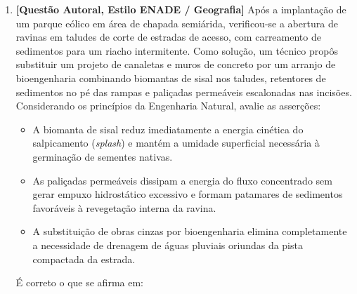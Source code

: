 \begin{enumerate}[leftmargin=1.8em, itemsep=7pt]
  \item \textbf{[Questão Autoral, Estilo ENADE / Geografia]} Após a implantação de um parque eólico em área de chapada semiárida, verificou-se a abertura de ravinas em taludes de corte de estradas de acesso, com carreamento de sedimentos para um riacho intermitente. Como solução, um técnico propôs substituir um projeto de canaletas e muros de concreto por um arranjo de bioengenharia combinando biomantas de sisal nos taludes, retentores de sedimentos no pé das rampas e paliçadas permeáveis escalonadas nas incisões. Considerando os princípios da Engenharia Natural, avalie as asserções:
  \begin{itemize}[leftmargin=1.4em, itemsep=2pt]
    \item[I.] A biomanta de sisal reduz imediatamente a energia cinética do salpicamento (\textit{splash}) e mantém a umidade superficial necessária à germinação de sementes nativas.
    \item[II.] As paliçadas permeáveis dissipam a energia do fluxo concentrado sem gerar empuxo hidrostático excessivo e formam patamares de sedimentos favoráveis à revegetação interna da ravina.
    \item[III.] A substituição de obras cinzas por bioengenharia elimina completamente a necessidade de drenagem de águas pluviais oriundas da pista compactada da estrada.
  \end{itemize}
  É correto o que se afirma em:


\end{enumerate}

